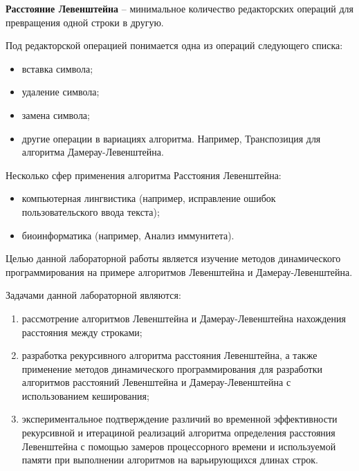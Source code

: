 
\textbf{Расстояние Левенштейна} -- минимальное количество редакторских операций для превращения одной строки в другую.

Под редакторской операцией понимается одна из операций следующего списка:
\begin{itemize}
    \item вставка символа;
    \item удаление символа;
    \item замена символа;
    \item другие операции в вариациях алгоритма. Например, Транспозиция для алгоритма Дамерау-Левенштейна.
\end{itemize}

Несколько сфер применения алгоритма Расстояния Левенштейна:

\begin{itemize}
\item компьютерная лингвистика (например, исправление ошибок пользовательского ввода текста);
\item биоинформатика (например, Анализ иммунитета).
\end{itemize}

Целью данной лабораторной работы является изучение методов динамического программирования на примере алгоритмов Левенштейна и Дамерау-Левенштейна.

Задачами данной лабораторной являются:
\begin{enumerate}
  \item рассмотрение алгоритмов Левенштейна и Дамерау-Левенштейна нахождения расстояния между строками;
  \item разработка рекурсивного алгоритма расстояния Левенштейна, а также применение методов динамического программирования для разработки алгоритмов расстояний Левенштейна и Дамерау-Левенштейна с использованием кеширования;
  \item экспериментальное подтверждение различий во временной эффективности рекурсивной и итерациной реализаций алгоритма определения расстояния Левенштейна с помощью замеров процессорного времени и используемой памяти при
  выполнении алгоритмов на варьирующихся длинах строк.
\end{enumerate}
\newpage
\clearpage